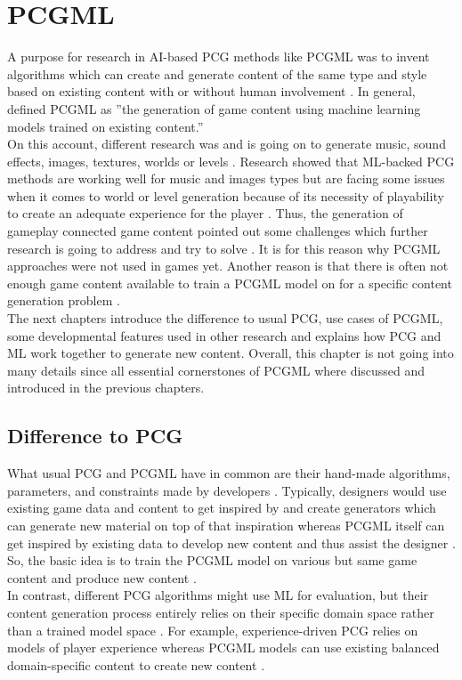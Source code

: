 \documentclass[MGS,Master,english]{twbook}%
\begin{document}
%
%
\clearpage
\chapter{\acl{PCGML}}
A purpose for research in AI-based PCG methods like PCGML was to invent algorithms which can create and generate content of the same type and style based on existing content with or without human involvement \cite{ai::book} \cite{pcgml::paper}. In general, \citep{pcgml::paper} defined PCGML as ''the generation of game content using machine learning models trained on existing content.'' \\
On this account, different research was and is going on to generate music, sound effects, images, textures, worlds or levels \cite{ai::book}. Research showed that ML-backed PCG methods are working well for music and images types but are facing some issues when it comes to world or level generation because of its necessity of playability to create an adequate experience for the player \cite{ai::book}. Thus, the generation of gameplay connected game content pointed out some challenges which further research is going to address and try to solve \cite{ai::book}. It is for this reason why PCGML approaches were not used in games yet. Another reason is that there is often not enough game content available to train a PCGML model on for a specific content generation problem \cite{ai::book}. \\
The next chapters introduce the difference to usual PCG, use cases of PCGML, some developmental features used in other research and explains how PCG and ML work together to generate new content. Overall, this chapter is not going into many details since all essential cornerstones of PCGML where discussed and introduced in the previous chapters.

\section{Difference to \acl{PCG}}
What usual PCG and PCGML have in common are their hand-made algorithms, parameters, and constraints made by developers \cite{pcgml::paper}. Typically, designers would use existing game data and content to get inspired by and create generators which can generate new material on top of that inspiration whereas PCGML itself can get inspired by existing data to develop new content and thus assist the designer \cite{pcgml::paper}. So, the basic idea is to train the PCGML model on various but same game content and produce new content \cite{pcgml::paper}. \\
In contrast, different PCG algorithms might use ML for evaluation, but their content generation process entirely relies on their specific domain space rather than a trained model space \cite{pcgml::paper}. For example, experience-driven PCG relies on models of player experience whereas PCGML models can use existing balanced domain-specific content to create new content \cite{pcgml::paper}.
\end{document}
